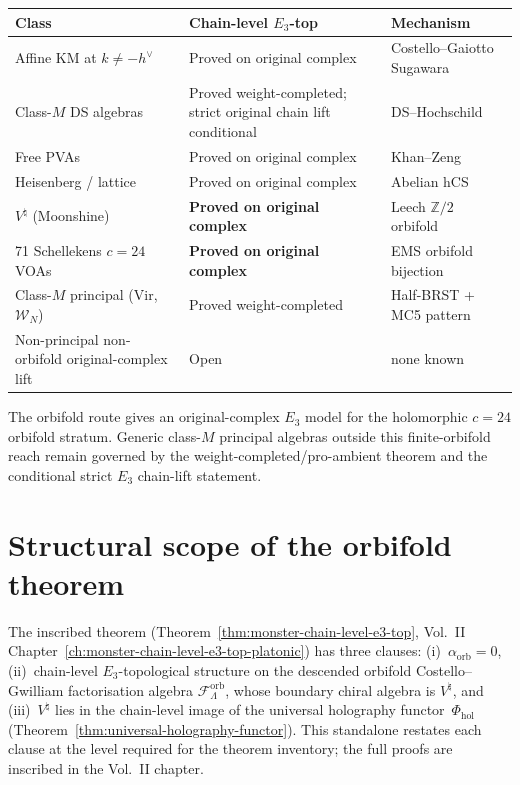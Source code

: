 \documentclass[11pt]{amsart}
\theoremstyle{definition}
\theoremstyle{remark}
\providecommand{\Z}{\mathbb{Z}}
\providecommand{\cF}{\mathcal{F}}
\begin{document}
\begin{center}
\renewcommand{\arraystretch}{1.3}
\begin{tabular}{lll}
\textbf{Class} & \textbf{Chain-level $E_3$-top} & \textbf{Mechanism} \\
\hline
Affine KM at $k \neq -h^\vee$ & Proved on original complex & Costello--Gaiotto
Sugawara \\
Class-$M$ DS algebras & Proved weight-completed; strict original
chain lift conditional & DS--Hochschild \\
Free PVAs & Proved on original complex & Khan--Zeng \\
Heisenberg / lattice & Proved on original complex & Abelian hCS \\
$V^\natural$ (Moonshine) & \textbf{Proved on original complex} & Leech
$\Z/2$ orbifold \\
71 Schellekens $c=24$ VOAs & \textbf{Proved on original complex} &
EMS orbifold bijection \\
Class-$M$ principal (Vir, $\mathcal{W}_N$) & Proved weight-completed &
Half-BRST + MC5 pattern \\
Non-principal non-orbifold original-complex lift & Open & none known
\end{tabular}
\end{center}

The orbifold route gives an original-complex $E_3$ model for the
holomorphic $c=24$ orbifold stratum. Generic class-$M$ principal
algebras outside this finite-orbifold reach remain governed by the
weight-completed/pro-ambient theorem and the conditional strict
$E_3$ chain-lift statement.

\section{Structural scope of the orbifold theorem}

The inscribed theorem
(Theorem~\ref*{thm:monster-chain-level-e3-top}, Vol.~II
Chapter~\ref*{ch:monster-chain-level-e3-top-platonic}) has three
clauses: (i)~$\alpha_{\mathrm{orb}} = 0$, (ii)~chain-level
$E_3$-topological structure on the descended orbifold
Costello--Gwilliam factorisation algebra
$\cF_\Lambda^{\mathrm{orb}}$, whose boundary chiral algebra is
$V^\natural$, and (iii)~$V^\natural$ lies in the chain-level image of
the universal holography functor~$\Phi_{\mathrm{hol}}$
(Theorem~\ref*{thm:universal-holography-functor}). This standalone restates each clause
at the level required for the theorem inventory; the full proofs are
inscribed in the Vol.~II chapter.
\end{document}
